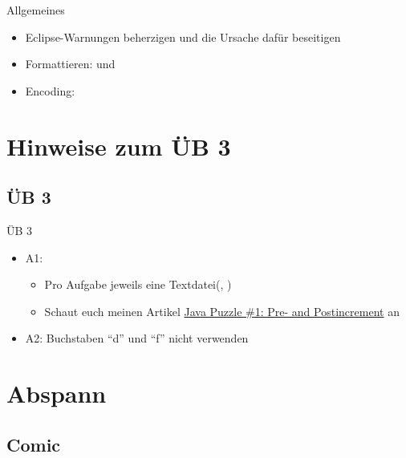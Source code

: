 \documentclass[usepdftitle=false,hyperref={pdfpagelabels=false}]{beamer}
\begin{document}

\begin{frame}{Allgemeines}
    \begin{itemize}
        \item Eclipse-Warnungen beherzigen und die Ursache dafür beseitigen
        \item Formattieren:  und 
        \item Encoding: 
    \end{itemize}
\end{frame}

\section{Hinweise zum ÜB 3}
\subsection{ÜB 3}
\begin{frame}{ÜB 3}
    \begin{itemize}
        \item A1:
        \begin{itemize}
            \item Pro Aufgabe jeweils eine Textdatei(, )
            \item Schaut euch meinen Artikel \href{http://martin-thoma.com/java-puzzle-1-pre-and-postincrement/}{Java Puzzle \#1: Pre- and Postincrement} an
        \end{itemize}
        \item A2: Buchstaben "`d"' und "`f"' nicht verwenden
    \end{itemize}
\end{frame}

\section{Abspann}
\subsection{Comic}
\end{document}
